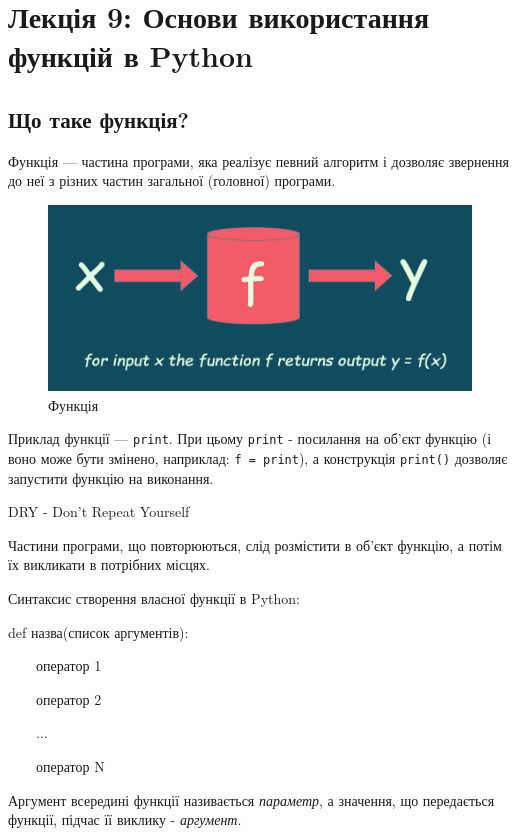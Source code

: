 \section{Лекція 9: Основи використання функцій в Python}
 
 \subsection{Що таке функція?} 
\begin{frame}
Функція — частина програми, яка реалізує певний алгоритм і дозволяє звернення до неї з різних частин загальної (головної) програми.
\begin{figure}
  \begin{center}
    \includegraphics[width=\textwidth,height=0.4\textheight]{pictures/function.png}
  \caption{Функція}
\label{function}
  \end{center}
\end{figure}
\end{frame}

\begin{frame}
Приклад функції — \texttt{print}. При цьому \texttt{print} - посилання на об'єкт функцію (і воно може бути змінено, наприклад: \texttt{f = print}), а конструкція \texttt{print()} дозволяє запустити функцію на виконання.

\begin{center}
\large{DRY - Don't Repeat Yourself}
\end{center}

\normalsize Частини програми, що повторюються, слід розмістити в об'єкт функцію, а потім їх викликати в потрібних місцях.
\end{frame}

\begin{frame}
Синтаксис створення власної функції в Python:

\LARGE{def назва(список аргументів):

~~~~оператор 1

~~~~оператор 2

~~~~... 

~~~~оператор N }

\vspace{0.5cm}
\normalsize Аргумент всередині функції називається \textit{параметр}, а значення, що передається функції, підчас її виклику - \textit{аргумент}.
\end{frame}

